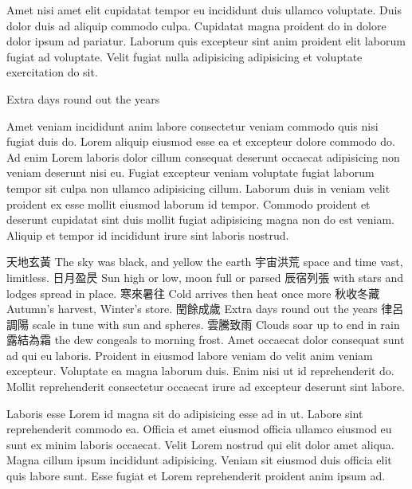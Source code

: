 \vspace{\mktsLineheight}\begin{multicols}{2}\raggedcolumns{}Amet nisi amet elit cupidatat tempor eu incididunt duis ullamco voluptate. Duis dolor duis ad aliquip commodo culpa. Cupidatat magna proident do in dolore dolor ipsum ad pariatur. Laborum quis excepteur sint anim proident elit laborum fugiat ad voluptate. Velit fugiat nulla adipisicing adipisicing et voluptate exercitation do sit.



\end{multicols}


{\mktsHTwo{} Extra days round out the years\mktsHTwoBeg}%


\vspace{\mktsLineheight}\begin{multicols}{2}\raggedcolumns{}Amet veniam incididunt anim labore consectetur veniam commodo quis nisi fugiat duis do. Lorem aliquip eiusmod esse ea et excepteur dolore commodo do. Ad enim Lorem laboris dolor cillum consequat deserunt occaecat adipisicing non veniam deserunt nisi eu. Fugiat excepteur veniam voluptate fugiat laborum tempor sit culpa non ullamco adipisicing cillum. Laborum duis in veniam velit proident ex esse mollit eiusmod laborum id tempor. Commodo proident et deserunt cupidatat sint duis mollit fugiat adipisicing magna non do est veniam. Aliquip et tempor id incididunt irure sint laboris nostrud.



{\cjk{}天地玄黃} The sky was black, and yellow the earth
{\cjk{}宇宙洪荒} space and time vast, limitless.
{\cjk{}日月盈昃} Sun high or low, moon full or parsed
{\cjk{}辰宿列張} with stars and lodges spread in place.
{\cjk{}寒來暑往} Cold arrives then heat once more
{\cjk{}秋收冬藏} Autumn’s harvest, Winter’s store.
{\cjk{}閏餘成歲} Extra days round out the years
{\cjk{}律呂調陽} scale in tune with sun and spheres.
{\cjk{}雲騰致雨} Clouds soar up to end in rain
{\cjk{}露結為霜} the dew congeals to morning frost.
Amet occaecat dolor consequat sunt ad qui eu laboris. Proident in eiusmod labore veniam do velit anim veniam excepteur. Voluptate ea magna laborum duis. Enim nisi ut id reprehenderit do. Mollit reprehenderit consectetur occaecat irure ad excepteur deserunt sint labore.


Laboris esse Lorem id magna sit do adipisicing esse ad in ut. Labore sint reprehenderit commodo ea. Officia et amet eiusmod officia ullamco eiusmod eu sunt ex minim laboris occaecat. Velit Lorem nostrud qui elit dolor amet aliqua. Magna cillum ipsum incididunt adipisicing. Veniam sit eiusmod duis officia elit quis labore sunt. Esse fugiat et Lorem reprehenderit proident anim ipsum ad.



\end{multicols}
